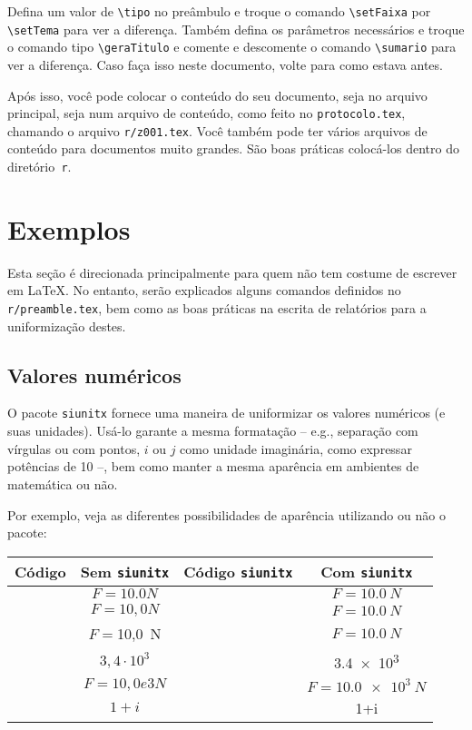 \documentclass[brazilian, 11pt, oneside, a4paper]{article}
\newcommand{\codeandmath}[1]{%
    \mbox{\ttfamily \detokenize{#1}} & \mbox{#1}
}
\begin{document}
Defina um valor de \verb$\tipo$ no preâmbulo e troque o comando \verb$\setFaixa$ por \verb$\setTema$ para ver a diferença. Também defina os parâmetros necessários e troque o comando tipo \verb$\geraTitulo$ e comente e descomente o comando \verb$\sumario$ para ver a diferença. Caso faça isso neste documento, volte para como estava antes.

Após isso, você pode colocar o conteúdo do seu documento, seja no arquivo principal, seja num arquivo de conteúdo, como feito no \verb$protocolo.tex$, chamando o arquivo \verb$r/z001.tex$. Você também pode ter vários arquivos de conteúdo para documentos muito grandes. São boas práticas colocá-los dentro do diretório\verb$ r$.

\section{Exemplos}\label{sec:Exemplos}
Esta seção é direcionada principalmente para quem não tem costume de escrever em LaTeX. No entanto, serão explicados alguns comandos definidos no \verb$r/preamble.tex$, bem como as boas práticas na escrita de relatórios para a uniformização destes.

\subsection{Valores numéricos}
O pacote \verb$siunitx$ fornece uma maneira de uniformizar os valores numéricos (e suas unidades). Usá-lo garante a mesma formatação -- e.g., separação com vírgulas ou com pontos, $i$ ou $j$ como unidade imaginária, como expressar potências de 10 --, bem como manter a mesma aparência em ambientes de matemática ou não.

Por exemplo, veja as diferentes possibilidades de aparência utilizando ou não o pacote:

\begin{table}[h]
\centering
\begin{tabular}{cccc}
\toprule
    Código & Sem \verb$siunitx$  &  Código \verb$siunitx$ & Com \verb$siunitx$ \\ \midrule
    \codeandmath{$F=10.0 N$}     &  \codeandmath{$F=\SI{10.0}{N}$} \\
    \codeandmath{$F=10,0 N$}     &  \codeandmath{$F=\SI{10,0}{N}$} \\
    \codeandmath{$F=$10,0 N}     &  \codeandmath{$F=\SI{10,0}{N}$} \\
    \codeandmath{$3,4\cdot10^3$} &  \codeandmath{\num{3,4e3}}  \\
    \codeandmath{$F=10,0e3 N$}   &  \codeandmath{$F=\SI{10,0e3}{N}$}  \\ 
    \codeandmath{$1+i$}          &  \codeandmath{\num{1+i}}  \\ \bottomrule
\end{tabular}
\end{table}
\end{document}
